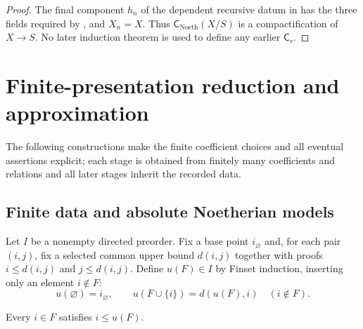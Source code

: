 \begin{proof}
  \leanok
  The final component $h_n$ of the dependent recursive datum in
   has the three fields required
  by , and $X_n=X$.  Thus
  $\mathsf C_{\mathrm{Noeth}}(X/S)$ is a compactification of $X\to S$.  No
  later induction theorem is used to define any earlier $\mathsf C_r$.
\end{proof}


\section{Finite-presentation reduction and approximation}

The following constructions make the finite coefficient choices and all
eventual assertions explicit; each stage is obtained from finitely many
coefficients and relations and all later stages inherit the recorded data.

\subsection{Finite data and absolute Noetherian models}

\begin{definition}
  \label{def:nagata-directed-finite-upper-bound}

  Let $I$ be a nonempty directed preorder.  Fix a base point $i_\varnothing$
  and, for each pair $(i,j)$, fix a selected common upper bound $d(i,j)$
  together with proofs $i\leq d(i,j)$ and $j\leq d(i,j)$.  Define
  $u(F)\in I$ by Finset induction, inserting only an element $i\notin F$:
  \[
    u(\varnothing)=i_\varnothing,
    \qquad
    u(F\cup\{i\})=d(u(F),i)\quad(i\notin F).
  \]
\end{definition}

\begin{lemma}
  \label{lemma:nagata-directed-finite-upper-bound}

  Every $i\in F$ satisfies $i\leq u(F)$.
\end{lemma}

